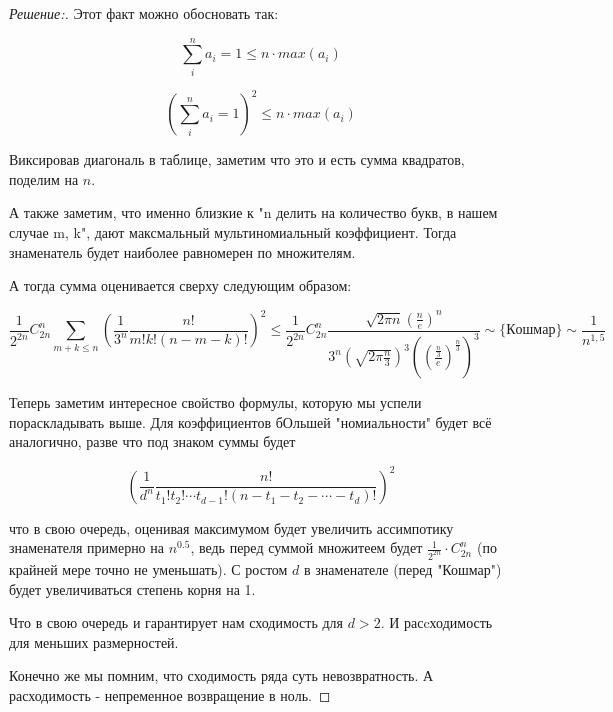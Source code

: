 \documentclass{article}
\begin{document}
\begin{proof}[Решение:]
Этот факт можно обосновать так:

\[
    \sum_{i}^n a_i = 1 \leq n \cdot max(a_i)

\]

\[
    \left(\sum_{i}^n a_i = 1\right)^2 \leq n \cdot max(a_i)
\]

Виксировав диагональ в таблице, заметим что это и есть сумма квадратов, поделим на $n$.

\vspace{\baselineskip}

А также заметим, что именно близкие к "n делить на количество букв, в нашем случае m, k", дают максмальный мультиномиальный коэффициент. Тогда знаменатель будет наиболее равномерен по множителям.

А тогда сумма оценивается сверху следующим образом:

\[
\frac{1}{2^{2n}} C_{2n}^n \sum_{m + k \leq n}^{} \left( \frac{1}{3^n} \frac{n!}{m!k!(n-m-k)!}   \right)^2 \leq \frac{1}{2^{2n}} C_{2n}^n \frac{\sqrt{2 \pi n}\left(\frac{n}{e}\right)^n}{3^n   (\sqrt{2 \pi \frac{n}{3}})^3 \left(\left(\frac{\frac{n}{3}}{e} \right)^\frac{n}{3}\right)^3} \sim \{Кошмар\} \sim \frac{1}{n^{1,5}}
\]

        

Теперь заметим интересное свойство формулы, которую мы успели пораскладывать выше. Для коэффициентов бОльшей "номиальности" будет всё аналогично, разве что под знаком суммы будет

\[
\left(\frac{1}{d^n} \frac{n!}{t_1 ! t_2 ! \cdots t_{d-1}! (n - t_1 - t_2 - \cdots - t_d)!}\right)^2
\]

что в свою очередь, оценивая максимумом будет увеличить ассимпотику знаменателя примерно на $n^{0.5}$, ведь перед суммой множитеем будет $\frac{1}{2^{2n}} \cdot C_{2n}^n$ (по крайней мере точно не уменьшать). С ростом $d$ в знаменателе (перед "Кошмар") будет увеличиваться степень корня на 1.

Что в свою очередь и гарантирует нам сходимость для $d > 2$. И расcходимость для меньших размерностей. 

Конечно же мы помним, что сходимость ряда суть невозвратность. А расходимость - непременное возвращение в ноль.
\end{proof}
        
        
        
        
\end{document}
